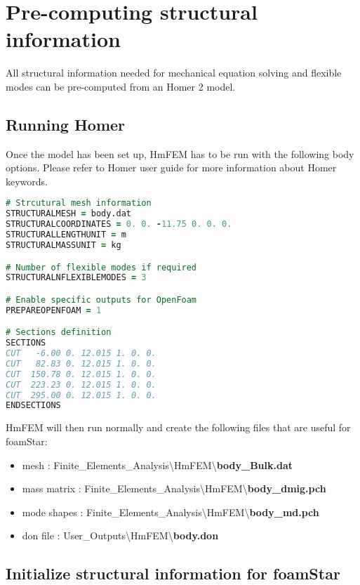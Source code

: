 \chapter{Pre-computing structural information}
\label{homer}

All structural information needed for mechanical equation solving and flexible modes can be pre-computed from an Homer 2 model.

\section{Running Homer}
Once the model has been set up, HmFEM has to be run with the following body options. Please refer to Homer user guide for more information about Homer keywords.

\begin{lstlisting}[language=fortran]
# Strcutural mesh information
STRUCTURALMESH = body.dat
STRUCTURALCOORDINATES = 0. 0. -11.75 0. 0. 0.
STRUCTURALLENGTHUNIT = m
STRUCTURALMASSUNIT = kg

# Number of flexible modes if required
STRUCTURALNFLEXIBLEMODES = 3

# Enable specific outputs for OpenFoam
PREPAREOPENFOAM = 1

# Sections definition
SECTIONS
CUT   -6.00 0. 12.015 1. 0. 0.
CUT   82.83 0. 12.015 1. 0. 0.
CUT  150.78 0. 12.015 1. 0. 0.
CUT  223.23 0. 12.015 1. 0. 0.
CUT  295.00 0. 12.015 1. 0. 0.
ENDSECTIONS
\end{lstlisting}

HmFEM will then run normally and create the following files that are useful for foamStar:
\begin{itemize}
\item mesh : Finite\_Elements\_Analysis{\textbackslash}HmFEM{\textbackslash}\textbf{body\_Bulk.dat}
\item mass matrix : Finite\_Elements\_Analysis{\textbackslash}HmFEM{\textbackslash}\textbf{body\_dmig.pch}
\item mode shapes : Finite\_Elements\_Analysis{\textbackslash}HmFEM{\textbackslash}\textbf{body\_md.pch}
\item don file : User\_Outputs{\textbackslash}HmFEM{\textbackslash}\textbf{body.don}
\end{itemize}

\section{Initialize structural information for foamStar}

